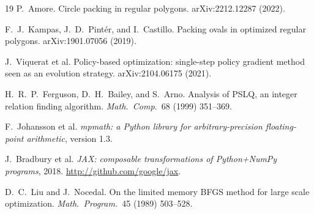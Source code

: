 \documentclass[11pt]{article}
\begin{document}
\begin{thebibliography}{19}
 P.~Amore. Circle packing in regular polygons.
arXiv:2212.12287 (2022). %

 F.~J.~Kampas, J.~D.~Pint\'er, and I.~Castillo. Packing ovals
in optimized regular polygons. arXiv:1901.07056 (2019). %

 J.~Viquerat et al. Policy-based optimization:
single-step policy gradient method seen as an evolution strategy.
arXiv:2104.06175 (2021).

 H.~R.~P.~Ferguson, D.~H.~Bailey, and S.~Arno. Analysis of PSLQ,
an integer relation finding algorithm. \emph{Math.\ Comp.}\ 68 (1999) 351--369.

 F.~Johansson et al. \emph{mpmath: a Python library for
arbitrary-precision floating-point arithmetic}, version 1.3.

 J.~Bradbury et al. \emph{JAX: composable transformations of
Python+NumPy programs}, 2018. \url{http://github.com/google/jax}.

 D.~C.~Liu and J.~Nocedal. On the limited memory BFGS method
for large scale optimization. \emph{Math.\ Program.}\ 45 (1989) 503--528.

\end{thebibliography}
\end{document}
